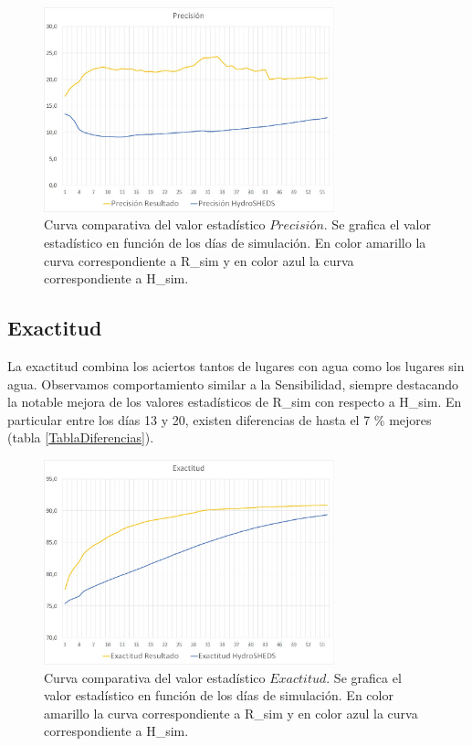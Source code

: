 \documentclass[10pt,a4paper, twoside]{report}
\begin{document}
\begin{figure}[H]
   \centering      
   \includegraphics[width=0.75\textwidth]{imagenes/Precision.jpg}
 \caption{Curva comparativa del valor estadístico $Precisión$. Se grafica el valor estadístico en función de los días de simulación. En color amarillo la curva correspondiente a R\_sim y en color azul la curva correspondiente a H\_sim.}
 \label{Precision}
\end{figure}

\subsection{Exactitud}

La exactitud combina los aciertos tantos de lugares con agua como los lugares sin agua. Observamos comportamiento similar a la Sensibilidad, siempre destacando la notable mejora de los valores estadísticos de R\_sim con respecto a H\_sim. En particular entre los días 13 y 20, existen diferencias de hasta el 7 \% mejores (tabla \ref{TablaDiferencias}).

\begin{figure}[H]
   \centering      
   \includegraphics[width=0.75\textwidth]{imagenes/Exactitud.jpg}
 \caption{Curva comparativa del valor estadístico $Exactitud$. Se grafica el valor estadístico en función de los días de simulación. En color amarillo la curva correspondiente a R\_sim y en color azul la curva correspondiente a H\_sim.}
 \label{Exactitud}
\end{figure}
\end{document}
